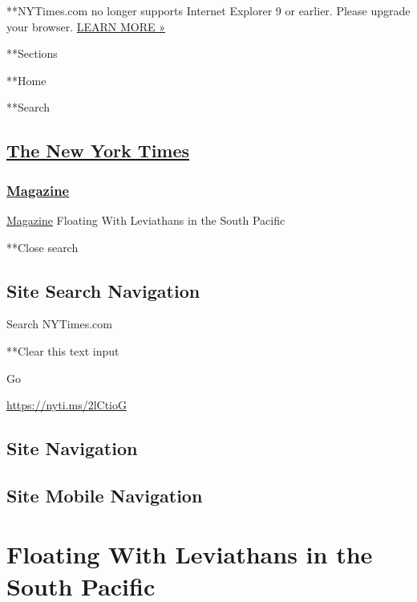  **NYTimes.com no longer supports Internet Explorer 9 or earlier. Please
upgrade your browser.
\href{http://www.nytimes3xbfgragh.onion/content/help/site/ie9-support.html}{LEARN
MORE »}

**Sections

**Home

**Search

\hypertarget{the-new-york-times}{%
\subsection{\texorpdfstring{\href{http://www.nytimes3xbfgragh.onion/}{The
New York Times}}{The New York Times}}\label{the-new-york-times}}

\hypertarget{-magazine-}{%
\subsubsection{\texorpdfstring{
\href{https://www.nytimes3xbfgragh.onion/section/magazine}{Magazine}
}{ Magazine }}\label{-magazine-}}

 \href{https://www.nytimes3xbfgragh.onion/section/magazine}{Magazine}
\textbar{}Floating With Leviathans in the South Pacific

**Close search

\hypertarget{site-search-navigation}{%
\subsection{Site Search Navigation}\label{site-search-navigation}}

Search NYTimes.com

**Clear this text input

Go

\url{https://nyti.ms/2lCtioG}

\hypertarget{site-navigation}{%
\subsection{Site Navigation}\label{site-navigation}}

\hypertarget{site-mobile-navigation}{%
\subsection{Site Mobile Navigation}\label{site-mobile-navigation}}

\hypertarget{floating-with-leviathans-in-the-south-pacific}{%
\section{Floating With Leviathans in the South
Pacific}\label{floating-with-leviathans-in-the-south-pacific}}

